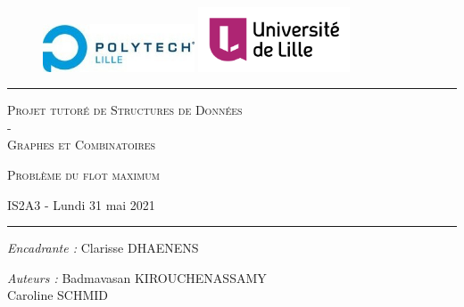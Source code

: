 \documentclass[11pt, a4paper]{report}
\begin{document}
	\begin{titlepage}
		\begin{center}
			
			\vspace*{1cm}
			
			\begin{figure}[h]
				\centering
				\includegraphics[width=0.4\textwidth]{images/LOGO_Polytech-lille.jpg}
				\hspace{2cm}
				\includegraphics[width=0.4\textwidth]{images/logo_ulille_transparent.png}
			\end{figure}
			
			\vspace*{2cm}
			
			\rule{1\textwidth}{.8pt}
			
			\LARGE{\textsc{Projet tutoré de Structures de Données \\-\\ Graphes et Combinatoires}}
			
			\vspace*{1cm}
			
			\LARGE{\textsc{Problème du flot maximum}}
			\vspace*{1cm}
			
			\small{IS2A3 - Lundi 31 mai 2021}
			
			\vspace*{0.5cm}
			\rule{1\textwidth}{.10pt}
		
			\vspace*{2.352cm}
			
			\large{\textit{Encadrante :} Clarisse DHAENENS}
			
			\vspace*{0.1cm}	        
			
			\large{\textit{Auteurs :} Badmavasan KIROUCHENASSAMY\\Caroline SCHMID} 
			
			
			
			
		\end{center}
		
	\end{titlepage}
	
\end{document}
